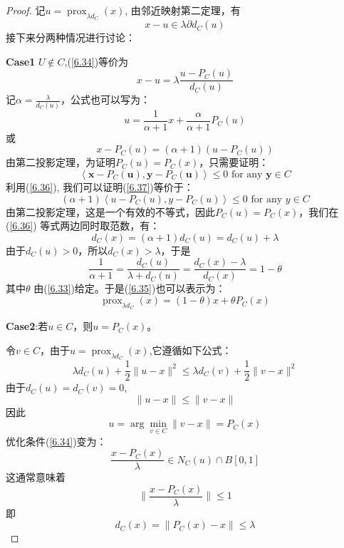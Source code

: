 \documentclass[fontset=mac]{ctexart}
\begin{document}
	\begin{proof}
		记$u = \operatorname{prox}_{\lambda d _C}(x)$, 由邻近映射第二定理，有
		\begin{equation}
			{x}-{u} \in \lambda \partial d_{C}({u}) \label{6.34}
		\end{equation}
	接下来分两种情况进行讨论：
	
	\textbf{Case1}
	$U \notin C$,(\ref{6.34})等价为
	\begin{equation}
		{x}-{u}=\lambda \frac{{u}-P_{C}({u})}{d_{C}({u})}
	\end{equation}
	记$\alpha = \frac{\lambda}{d_C(u)}$，公式也可以写为：
	\begin{equation}
		{u}=\frac{1}{\alpha+1} {x}+\frac{\alpha}{\alpha+1} P_{C}({u}) \label{6.35}
	\end{equation}
	或
	\begin{equation}
		{x}-P_{C}({u})=(\alpha+1)\left({u}-P_{C}({u})\right) \label{6.36}
	\end{equation}
	由第二投影定理，为证明$P_C(u)=P_C(x)$，只需要证明：
	\begin{equation}
		\left\langle\mathbf{x}-P_{C}(\mathbf{u}), \mathbf{y}-P_{C}(\mathbf{u})\right\rangle \leq 0 \text { for any } \mathbf{y} \in C \label{6.37}
	\end{equation}
	利用(\ref{6.36}), 我们可以证明(\ref{6.37})等价于：
	\begin{equation}
		(\alpha+1)\left\langle{u}-P_{C}({u}), {y}-P_{C}({u})\right\rangle \leq 0 \text { for any } {y} \in C
	\end{equation}
	由第二投影定理，这是一个有效的不等式，因此$P_C(u)=P_C(x)$，我们在(\ref{6.36})
	等式两边同时取范数，有：
	\begin{equation}
		d_C(x) = (\alpha + 1)d_C(u) = d_C(u) + \lambda
	\end{equation}
	由于$d_C(u)>0$，所以$d_C(x) > \lambda$，于是
	\begin{equation}
		\frac{1}{\alpha+1}=\frac{d_{C}({u})}{\lambda+d_{C}({u})}=\frac{d_{C}({x})-\lambda}{d_{C}({x})}=1-\theta
	\end{equation}
	其中$\theta$ 由(\ref{6.33})给定。于是(\ref{6.35})也可以表示为：
	\begin{equation}
		\operatorname{prox}_{\lambda d_C}(x) = (1 - \theta)x + \theta P_C(x)
	\end{equation}

	\textbf{Case2}:若$u \in C$，则$u = P_C(x)$。
	
	令$v \in C$，由于$u = \operatorname{prox}_{\lambda d_C}(x)$,它遵循如下公式：
	\begin{equation}
		\lambda d_C(u) + \frac{1}{2}\|u - x\|^2 \le \lambda d_C(v) + \frac{1}{2}\|v - x\|^2
	\end{equation}
	由于$d_C(u)=d_C(v)=0$,
	$$
	\|u - x\| \le \|v - x\|
	$$
	因此
	$$
	u = \arg \min_{v \in C}\|v - x\| = P_C(x)
	$$
	优化条件(\ref{6.34})变为：
	$$
	\frac{x - P_C(x)}{\lambda} \in N_C(u) \cap B[0,1]
	$$
	这通常意味着
	$$
	\|\frac{x - P_C(x)}{\lambda}\| \le 1
	$$ 
	即
	$$
	d_C(x) = \|P_C(x) - x\| \le \lambda
	$$
	\end{proof}
\end{document}
